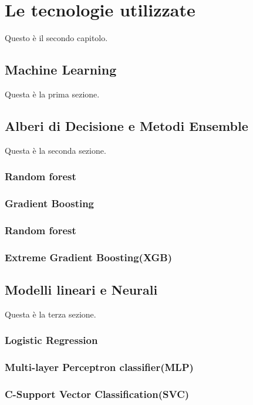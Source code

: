 \clearpage{\pagestyle{empty}\cleardoublepage}
\chapter{Le tecnologie utilizzate}                %

Questo \`e il secondo capitolo.
\section{Machine Learning}                 %
Questa \`e la prima sezione.



\section{Alberi di Decisione e Metodi Ensemble}                 %
Questa \`e la seconda sezione.
\subsection{Random forest}
\subsection{Gradient Boosting}
\subsection{Random forest}
\subsection{Extreme Gradient Boosting(XGB)}

\section{Modelli lineari e Neurali}                 %
Questa \`e la terza sezione.
\subsection{Logistic Regression}
\subsection{Multi-layer Perceptron classifier(MLP)}
\subsection{C-Support Vector Classification(SVC)}

